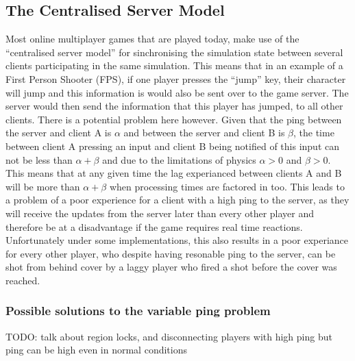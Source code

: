 \subsection{The Centralised Server Model}
Most online multiplayer games that are played today, make use of the ``centralised server model'' for sinchronising the simulation state between several clients participating in the same simulation. This means that in an example of a First Person Shooter (FPS), if one player presses the ``jump'' key, their character will jump and this information is would also be sent over to the game server. The server would then send the information that this player has jumped, to all other clients. There is a potential problem here however. Given that the ping between the server and client A is \(\alpha\) and between the server and client B is \(\beta\), the time between client A pressing an input and client B being notified of this input can not be less than $\alpha+\beta$ and due to the limitations of physics $\alpha>0$ and $\beta>0$. This means that at any given time the lag experianced between clients A and B will be more than $\alpha+\beta$ when processing times are factored in too. This leads to a problem of a poor experience for a client with a high ping to the server, as they will receive the updates from the server later than every other player and therefore be at a disadvantage if the game requires real time reactions. Unfortunately under some implementations, this also results in a poor experiance for every other player, who despite having resonable ping to the server, can be shot from behind cover by a laggy player who fired a shot before the cover was reached.
\subsubsection{Possible solutions to the variable ping problem}
TODO: talk about region locks, and disconnecting players with high ping but ping can be high even in normal conditions
